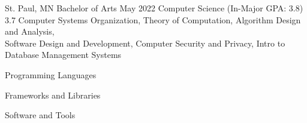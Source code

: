 \documentclass[12pt,letterpaper]{article}
\begin{document}
{\address{1600 Grand Ave, Saint Paul, MN 55105}}
{}
{}
{}
{}
{}

\begin{educationsection}
    {St. Paul, MN}
    {Bachelor of Arts}
    {May 2022}
    {Computer Science (In-Major GPA: 3.8)}
    {3.7}
    {Computer Systems Organization, Theory of Computation, Algorithm Design and Analysis,\\
        Software Design and Development, Computer Security and Privacy, Intro to Database Management Systems}
\end{educationsection}

\begin{skillsection}
    \begin{skillgroup}{Programming Languages}
    \end{skillgroup}
    \begin{skillgroup}{Frameworks and Libraries}
    \end{skillgroup}
    \begin{skillgroup}{Software and Tools}
    \end{skillgroup}
\end{skillsection}
\end{document}
